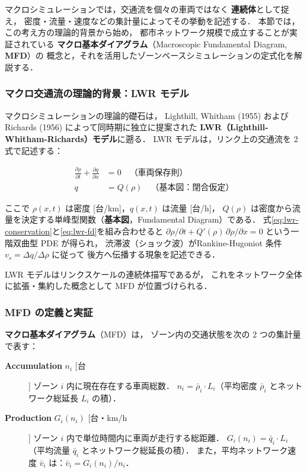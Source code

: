 マクロシミュレーションでは，交通流を個々の車両ではなく
\textbf{連続体}として捉え，
密度・流量・速度などの集計量によってその挙動を記述する．
本節では，この考え方の理論的背景から始め，
都市ネットワーク規模で成立することが実証されている
\textbf{マクロ基本ダイアグラム}（Macroscopic Fundamental Diagram, \textbf{MFD}）の
概念と，それを活用したゾーンベースシミュレーションの定式化を解説する\cite{Daganzo2007,Geroliminis2008}．

\subsubsection*{マクロ交通流の理論的背景：LWR モデル}

マクロシミュレーションの理論的礎石は，
Lighthill, Whitham (1955) および Richards (1956) によって同時期に独立に提案された
\textbf{LWR（Lighthill-Whitham-Richards）モデル}に遡る\cite{Lighthill1955,Richards1956}．
LWR モデルは，リンク上の交通流を 2 式で記述する：

\begin{align}
  \frac{\partial \rho}{\partial t}
  + \frac{\partial q}{\partial x}
  &= 0
  \quad \text{（車両保存則）}
  \label{eq:lwr-conservation} \\[4pt]
  q
  &= Q(\rho)
  \quad \text{（基本図：閉合仮定）}
  \label{eq:lwr-fd}
\end{align}

ここで $\rho(x,t)$ は密度 [台/km]，$q(x,t)$ は流量 [台/h]，
$Q(\rho)$ は密度から流量を決定する単峰型関数（\textbf{基本図}，Fundamental Diagram）である．
式\eqref{eq:lwr-conservation}と\eqref{eq:lwr-fd}を組み合わせると
$\partial \rho / \partial t + Q'(\rho)\,\partial \rho / \partial x = 0$
という一階双曲型 PDE が得られ，
渋滞波（ショック波）がRankine-Hugoniot 条件 $v_s = \Delta q / \Delta \rho$ に従って
後方へ伝播する現象を記述できる．

LWR モデルはリンクスケールの連続体描写であるが，
これをネットワーク全体に拡張・集約した概念として MFD が位置づけられる．

\subsubsection*{MFD の定義と実証}

\textbf{マクロ基本ダイアグラム}（MFD）は，
ゾーン内の交通状態を次の 2 つの集計量で表す\cite{Daganzo2007}：

\begin{description}
  \item[\textbf{Accumulation} $n_i$ [台]]
    ゾーン $i$ 内に現在存在する車両総数．
    $n_i = \bar{\rho}_i \cdot L_i$（平均密度 $\bar{\rho}_i$ とネットワーク総延長 $L_i$ の積）．

  \item[\textbf{Production} $G_i(n_i)$ [台・km/h]]
    ゾーン $i$ 内で単位時間内に車両が走行する総距離．
    $G_i(n_i) = \bar{q}_i \cdot L_i$（平均流量 $\bar{q}_i$ とネットワーク総延長の積）．
    また，平均ネットワーク速度 $\bar{v}_i$ は：$\bar{v}_i = G_i(n_i) / n_i$．
\end{description}

